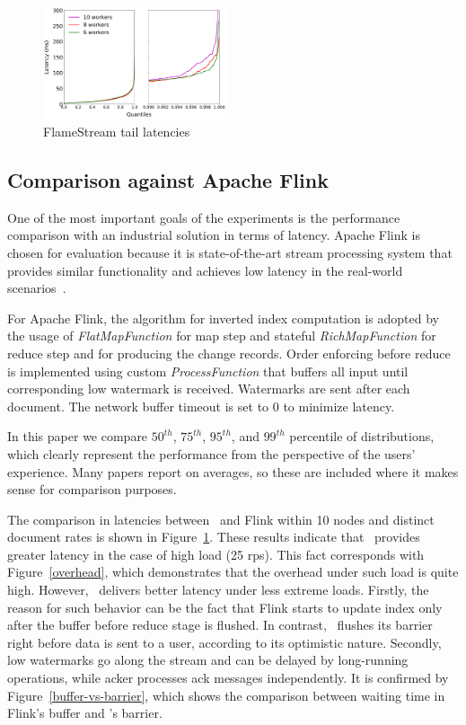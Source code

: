 \begin{figure}[htbp]
  \centering
  \includegraphics[width=0.48\textwidth]{pics/fs-index-quantiles}
  \caption{FlameStream tail latencies}
  \label {fs-index-quantiles}
\end{figure}

\subsection{Comparison against Apache Flink}

One of the most important goals of the experiments is the performance comparison with an industrial solution in terms of latency. Apache Flink is chosen for evaluation because it is state-of-the-art stream processing system that provides similar functionality and achieves low latency in the real-world scenarios~\cite{S7530084}. 

For Apache Flink, the algorithm for inverted index computation is adopted by the usage of {\it FlatMapFunction} for map step and stateful {\it RichMapFunction} for reduce step and for producing the change records. Order enforcing before reduce is implemented using custom {\it ProcessFunction} that buffers all input until corresponding low watermark is received. Watermarks are sent after each document. The network buffer timeout is set to 0 to minimize latency.

In this paper we compare $50^{th}$, $75^{th}$, $95^{th}$, and $99^{th}$ percentile of distributions, which clearly represent the performance from the perspective of the users' experience. Many papers report on averages, so these are included where it makes sense for comparison purposes. 

The comparison in latencies between \FlameStream\ and Flink within 10 nodes and distinct document rates is shown in Figure~\ref{fs-index-quantiles}. These results indicate that \FlameStream\ provides greater latency in the case of high load (25 rps). This fact corresponds with Figure~\ref{overhead}, which demonstrates that the overhead under such load is quite high. However, \FlameStream\ delivers better latency under less extreme loads. Firstly, the reason for such behavior can be the fact that Flink starts to update index only after the buffer before reduce stage is flushed. In contrast, \FlameStream\ flushes its barrier right before data is sent to a user, according to its optimistic nature. Secondly, low watermarks go along the stream and can be delayed by long-running operations, while acker processes ack messages independently. It is confirmed by Figure~\ref{buffer-vs-barrier}, which shows the comparison between waiting time in Flink's buffer and \FlameStream's barrier. 

